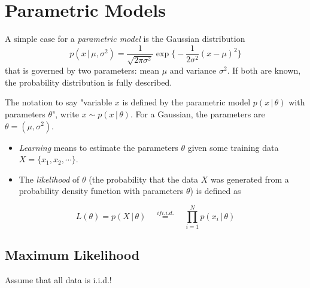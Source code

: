 \documentclass[a4paper, 11pt, accentcolor = tud3b]{tudreport}
\newcommand{\given}{\ensuremath{\,\vert\,}}
\begin{document}
		\section{Parametric Models}
			A simple case for a \emph{parametric model} is the Gaussian distribution
			\begin{equation}
				p(x \given \mu, \sigma^2) = \frac{1}{\sqrt{2\pi\sigma^2}} \exp\Bigg\{ -\frac{1}{2\sigma^2} (x - \mu)^2 \Bigg\}
			\end{equation}
			that is governed by two parameters: mean \(\mu\) and variance \(\sigma^2\). If both are known, the probability distribution is fully described.

			The notation to say "variable \(x\) is defined by the parametric model \( p(x \given \theta) \) with parameters \(\theta\)", write \( x \sim p(x \given \theta) \). For a Gaussian, the parameters are \( \theta = (\mu, \sigma^2) \).

			\begin{itemize}
				\item \emph{Learning} means to estimate the parameters \(\theta\) given some training data \( X = \{ x_1, x_2, \cdots \} \).
				\item The \emph{likelihood} of \(\theta\) (the probability that the data \(X\) was generated from a probability density function with parameters \(\theta\)) is defined as
			\end{itemize}
			\begin{equation}
				L(\theta) = p(X \given \theta) \quad\overset{if i.i.d.}{=}\quad \prod_{i = 1}^{N} p(x_i \given \theta)
			\end{equation}

			\subsection{Maximum Likelihood}
				Assume that all data is i.i.d.!
\end{document}

